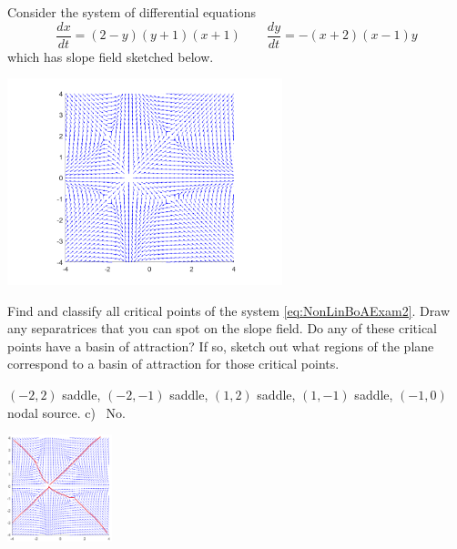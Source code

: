 \begin{exercise} 
Consider the system of differential equations
\begin{equation}
\frac{dx}{dt} = (2-y)(y+1)(x+1) \qquad \frac{dy}{dt} = -(x+2)(x-1)y \label{eq:NonLinBoAExam2}
\end{equation}
which has slope field sketched below.
\begin{center}
\includegraphics[width=0.6\textwidth]{Images/NLBoA_Ex2.png}
\end{center}
\begin{tasks}
\task Find and classify all critical points of the system \eqref{eq:NonLinBoAExam2}.
\task Draw any separatrices that you can spot on the slope field.
\task Do any of these critical points have a basin of attraction? If so, sketch out what regions of the plane correspond to a basin of attraction for those critical points. 
\end{tasks}
\end{exercise}
\comboSol{%
}
{%
\begin{multicols}{2}
\noindent $(-2, 2)$ saddle, $(-2, -1)$ saddle, $(1, 2)$ saddle, $(1, -1)$ saddle, $(-1, 0)$ nodal source.
 \quad c)~ No.
 
 \includegraphics[width=1.2in]{Images/NLBoA_Ex2_Soln.png}
\end{multicols}
}

\setcounter{exercise}{100}
